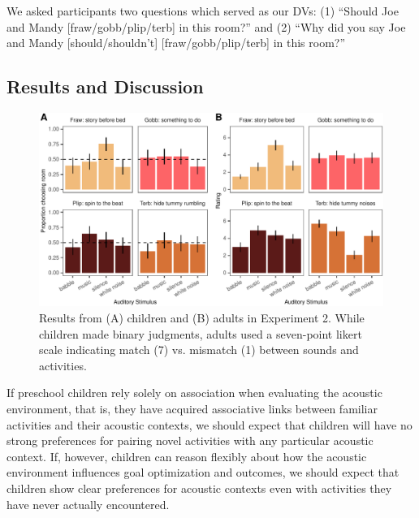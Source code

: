 \documentclass[10pt, letterpaper]{article}
\newenvironment{CodeChunk}{}{}
\begin{document}
We asked participants two questions which served as our DVs: (1)
``Should Joe and Mandy {[}fraw/gobb/plip/terb{]} in this room?'' and (2)
``Why did you say Joe and Mandy {[}should/shouldn't{]}
{[}fraw/gobb/plip/terb{]} in this room?''

\hypertarget{results-and-discussion-1}{%
\subsection{Results and Discussion}\label{results-and-discussion-1}}

\begin{CodeChunk}
\begin{figure}[t]

{\centering \includegraphics{figs/e4-summary-fig-1} 

}

\caption[Results from (A) children and (B) adults in Experiment 2]{Results from (A) children and (B) adults in Experiment 2. While children made binary judgments, adults used a seven-point likert scale indicating match (7) vs. mismatch (1) between sounds and activities.}\label{fig:e4-summary-fig}
\end{figure}
\end{CodeChunk}

If preschool children rely solely on association when evaluating the
acoustic environment, that is, they have acquired associative links
between familiar activities and their acoustic contexts, we should
expect that children will have no strong preferences for pairing novel
activities with any particular acoustic context. If, however, children
can reason flexibly about how the acoustic environment influences goal
optimization and outcomes, we should expect that children show clear
preferences for acoustic contexts even with activities they have never
actually encountered.
\end{document}
